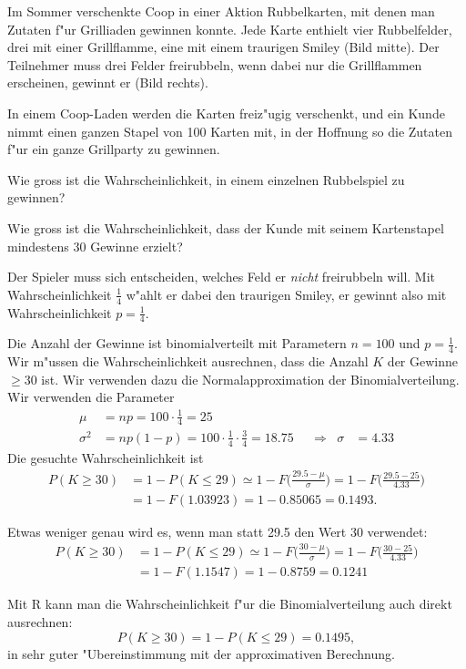 Im Sommer verschenkte Coop in einer Aktion Rubbelkarten, mit denen
man Zutaten f"ur Grilliaden gewinnen konnte.
Jede Karte enthielt vier Rubbelfelder, drei mit einer Grillflamme,
eine mit einem traurigen Smiley (Bild mitte).
Der Teilnehmer muss drei Felder freirubbeln, wenn dabei nur die Grillflammen
erscheinen, gewinnt er (Bild rechts).
\begin{center}
\end{center}
In einem Coop-Laden werden die Karten freiz"ugig verschenkt, und ein Kunde
nimmt einen ganzen Stapel von 100 Karten mit, in der Hoffnung so die Zutaten
f"ur ein ganze Grillparty zu gewinnen.

\begin{teilaufgaben}
\item Wie gross ist die Wahrscheinlichkeit, in einem einzelnen Rubbelspiel zu
gewinnen?
\item Wie gross ist die Wahrscheinlichkeit, dass der Kunde mit seinem 
Kartenstapel mindestens  30 Gewinne erzielt?
\end{teilaufgaben}

\begin{loesung}
\begin{teilaufgaben}
\item
Der Spieler muss sich entscheiden, welches Feld er {\em nicht} freirubbeln will.
Mit Wahrscheinlichkeit $\frac14$ w"ahlt er dabei den traurigen Smiley,
er gewinnt also mit Wahrscheinlichkeit $p=\frac14$.
\item
Die Anzahl der Gewinne ist binomialverteilt mit Parametern $n=100$ und
$p=\frac14$.
Wir m"ussen die Wahrscheinlichkeit ausrechnen, dass die Anzahl $K$ der
Gewinne $\ge 30$ ist. 
Wir verwenden dazu die Normalapproximation der Binomialverteilung.
Wir verwenden die Parameter
\[
\begin{aligned}
\mu&=np = 100\cdot \frac14=25\\
\sigma^2&=np(1-p)=100\cdot\frac14\cdot\frac34=18.75&&\Rightarrow&\sigma&=4.33
\end{aligned}
\]
Die gesuchte Wahrscheinlichkeit ist
\begin{align*}
P(K\ge 30)
&=1-P(K \le 29)
\simeq
1-F\biggl(\frac{29.5-\mu}{\sigma}\biggr)
=
1-F\biggl(\frac{29.5-25}{4.33}\biggr)
\\
&=
1-F(1.03923)=1-0.85065=0.1493.
\end{align*}

Etwas weniger genau wird es, wenn man statt 29.5 den Wert 30 verwendet:
\begin{align*}
P(K\ge 30)
&=1-P(K \le 29)
\simeq
1-F\biggl(\frac{30-\mu}{\sigma}\biggr)
=
1-F\biggl(\frac{30-25}{4.33}\biggr)
\\
&=
1-F(1.1547)=1-0.8759=0.1241
\end{align*}


Mit R kann man die Wahrscheinlichkeit f"ur die Binomialverteilung
auch direkt ausrechnen:
\[
P(K\ge 30)
=1-P(K\le 29)=0.1495,
\]
in sehr guter "Ubereinstimmung mit der approximativen Berechnung.
\end{teilaufgaben}
\end{loesung}

